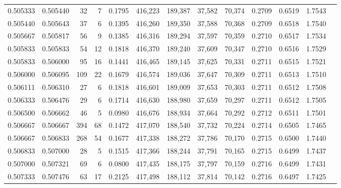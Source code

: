 \begin{tabular}{rrrrrrrrrrrrr}
0.505333 & 0.505440 &    32 &   7 &                                     0.1795 & 416,223 & 189,387 &  37,582 &  70,374 & 0.2709 & 0.6519 & 1.7543 \\
0.505440 & 0.505643 &    37 &   6 &                                     0.1395 & 416,260 & 189,350 &  37,588 &  70,368 & 0.2709 & 0.6518 & 1.7540 \\
0.505667 & 0.505817 &    56 &   9 &                                     0.1385 & 416,316 & 189,294 &  37,597 &  70,359 & 0.2710 & 0.6517 & 1.7534 \\
0.505833 & 0.505833 &    54 &  12 &                                     0.1818 & 416,370 & 189,240 &  37,609 &  70,347 & 0.2710 & 0.6516 & 1.7529 \\
0.505833 & 0.506000 &    95 &  16 &                                     0.1441 & 416,465 & 189,145 &  37,625 &  70,331 & 0.2711 & 0.6515 & 1.7521 \\
0.506000 & 0.506095 &   109 &  22 &                                     0.1679 & 416,574 & 189,036 &  37,647 &  70,309 & 0.2711 & 0.6513 & 1.7510 \\
0.506111 & 0.506310 &    27 &   6 &                                     0.1818 & 416,601 & 189,009 &  37,653 &  70,303 & 0.2711 & 0.6512 & 1.7508 \\
0.506333 & 0.506476 &    29 &   6 &                                     0.1714 & 416,630 & 188,980 &  37,659 &  70,297 & 0.2711 & 0.6512 & 1.7505 \\
0.506500 & 0.506662 &    46 &   5 &                                     0.0980 & 416,676 & 188,934 &  37,664 &  70,292 & 0.2712 & 0.6511 & 1.7501 \\
0.506667 & 0.506667 &   394 &  68 &                                     0.1472 & 417,070 & 188,540 &  37,732 &  70,224 & 0.2714 & 0.6505 & 1.7465 \\
0.506667 & 0.506833 &   268 &  54 &                                     0.1677 & 417,338 & 188,272 &  37,786 &  70,170 & 0.2715 & 0.6500 & 1.7440 \\
0.506833 & 0.507000 &    28 &   5 &                                     0.1515 & 417,366 & 188,244 &  37,791 &  70,165 & 0.2715 & 0.6499 & 1.7437 \\
0.507000 & 0.507321 &    69 &   6 &                                     0.0800 & 417,435 & 188,175 &  37,797 &  70,159 & 0.2716 & 0.6499 & 1.7431 \\
0.507333 & 0.507476 &    63 &  17 &                                     0.2125 & 417,498 & 188,112 &  37,814 &  70,142 & 0.2716 & 0.6497 & 1.7425 \\

\end{tabular}
